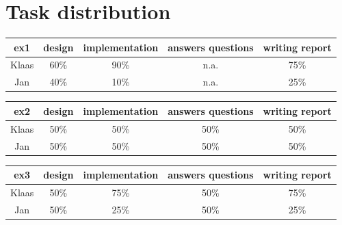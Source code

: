 \documentclass[a4paper]{article}
\begin{document}
\newpage
\section*{Task distribution}

\begin{table}[H]
\centering
\begin{tabular}{ccccc}
ex1 & design & implementation & answers questions & writing report \\
\hline
Klaas & 60\% & 90\% & n.a. & 75\% \\
\hline
Jan & 40\% & 10\% & n.a. & 25\% \\
\end{tabular}
\end{table}

\begin{table}[H]
\centering
\begin{tabular}{ccccc}
ex2 & design & implementation & answers questions & writing report \\
\hline
Klaas & 50\% & 50\% & 50\% & 50\% \\
\hline
Jan & 50\% & 50\% & 50\% & 50\% \\
\end{tabular}
\end{table}

\begin{table}[H]
\centering
\begin{tabular}{ccccc}
ex3 & design & implementation & answers questions & writing report \\
\hline
Klaas & 50\% & 75\% & 50\% & 75\% \\
\hline
Jan & 50\% & 25\% & 50\% & 25\% \\
\end{tabular}
\end{table} 
\end{document}

